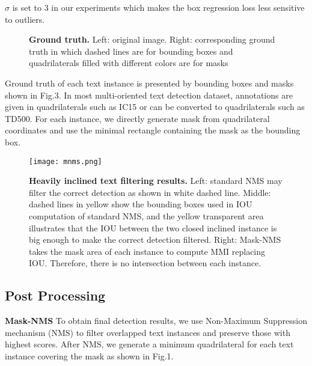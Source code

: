 \documentclass[a4paper,conference]{IEEEtran}
\begin{document}
\begin{math}\sigma\end{math} is set to 3 in our experiments which makes the box regression loss less sensitive to outliers. 

\begin{figure}
  \centering
  \hspace{0.1in}
  \caption{\textbf{Ground truth.} Left: original image. Right: corresponding ground truth in which dashed lines are for bounding boxes and quadrilaterals filled with different colors are for masks}
  \label{fig:subfig} \end{figure} 
Ground truth of each text instance is presented by bounding boxes and masks shown in Fig.3. In most multi-oriented text detection dataset, annotations are given in quadrilaterals such as IC15 or can be converted to quadrilaterals such as TD500. For each instance, we directly generate mask from quadrilateral coordinates and use the minimal rectangle containing the mask as the bounding box.
\begin{figure}[h]
\begin{center}
  
\texttt{[image: mnms.png]}
\caption{\textbf{Heavily inclined text filtering results.} Left: standard NMS may filter the correct detection as shown in white dashed line. Middle: dashed lines in yellow show the bounding boxes used in IOU computation of standard NMS, and the yellow transparent area illustrates that the IOU between the two closed inclined instance is big enough to make the correct detection filtered. Right: Mask-NMS takes the mask area of each instance to compute MMI replacing IOU. Therefore, there is no intersection between each instance. } 

\end{center}
\end{figure}






\subsection{Post Processing}
\textbf{Mask-NMS} To obtain final detection results, we use Non-Maximum Suppression mechanism (NMS) to filter overlapped text instances and preserve those with highest scores. After NMS, we generate a minimum quadrilateral for each text instance covering the mask as shown in Fig.1. 
\end{document}
